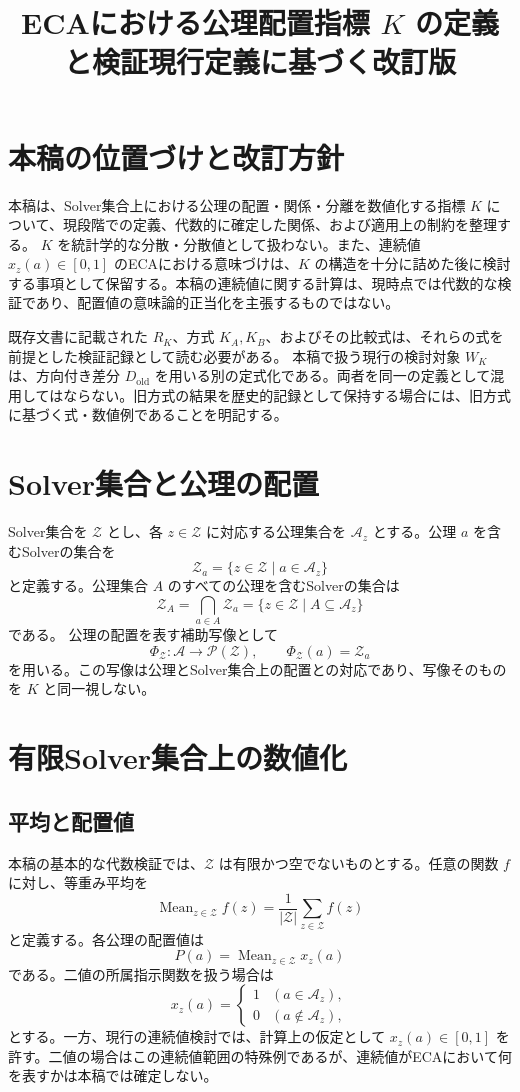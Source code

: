 \documentclass[a4paper,11pt]{ltjsarticle}
\title{ECAにおける公理配置指標 $K$ の定義と検証\textemdash 現行定義に基づく改訂版}
\author{}
\date{}
\begin{document}
\maketitle

\section{本稿の位置づけと改訂方針}
本稿は、Solver集合上における公理の配置・関係・分離を数値化する指標 $K$ について、現段階での定義、代数的に確定した関係、および適用上の制約を整理する。
$K$ を統計学的な分散・分散値として扱わない。また、連続値 $x_z(a)\in[0,1]$ のECAにおける意味づけは、$K$ の構造を十分に詰めた後に検討する事項として保留する。本稿の連続値に関する計算は、現時点では代数的な検証であり、配置値の意味論的正当化を主張するものではない。

既存文書に記載された $R_K$、方式 $K_A,K_B$、およびその比較式は、それらの式を前提とした検証記録として読む必要がある。
本稿で扱う現行の検討対象 $W_K$ は、方向付き差分 $D_{\mathrm{old}}$ を用いる別の定式化である。両者を同一の定義として混用してはならない。旧方式の結果を歴史的記録として保持する場合には、旧方式に基づく式・数値例であることを明記する。

\section{Solver集合と公理の配置}
Solver集合を $\mathcal{Z}$ とし、各 $z\in\mathcal{Z}$ に対応する公理集合を $\mathcal{A}_z$ とする。公理 $a$ を含むSolverの集合を
\[
\mathcal{Z}_a=\{z\in\mathcal{Z}\mid a\in\mathcal{A}_z\}
\]
と定義する。公理集合 $A$ のすべての公理を含むSolverの集合は
\[
\mathcal{Z}_A=\bigcap_{a\in A}\mathcal{Z}_a
=\{z\in\mathcal{Z}\mid A\subseteq\mathcal{A}_z\}
\]
である。
公理の配置を表す補助写像として
\[
\Phi_{\mathcal{Z}}:\mathcal{A}\to\mathcal{P}(\mathcal{Z}),\qquad
\Phi_{\mathcal{Z}}(a)=\mathcal{Z}_a
\]
を用いる。この写像は公理とSolver集合上の配置との対応であり、写像そのものを $K$ と同一視しない。

\section{有限Solver集合上の数値化}
\subsection{平均と配置値}
本稿の基本的な代数検証では、$\mathcal{Z}$ は有限かつ空でないものとする。任意の関数 $f$ に対し、等重み平均を
\[
\operatorname{Mean}_{z\in\mathcal{Z}}f(z)
=\frac{1}{|\mathcal{Z}|}\sum_{z\in\mathcal{Z}}f(z)
\]
と定義する。各公理の配置値は
\[
P(a)=\operatorname{Mean}_{z\in\mathcal{Z}}x_z(a)
\]
である。二値の所属指示関数を扱う場合は
\[
x_z(a)=\begin{cases}1 &(a\in\mathcal{A}_z),\\0 &(a\notin\mathcal{A}_z),\end{cases}
\]
とする。一方、現行の連続値検討では、計算上の仮定として $x_z(a)\in[0,1]$ を許す。二値の場合はこの連続値範囲の特殊例であるが、連続値がECAにおいて何を表すかは本稿では確定しない。
\end{document}
